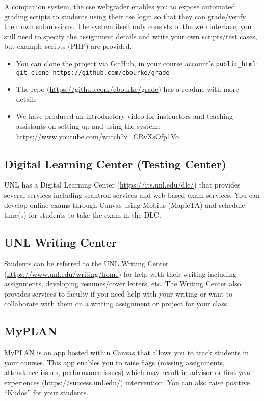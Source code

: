 \documentclass[12pt]{scrartcl}
\begin{document}
A companion system, the cse webgrader enables you to expose
automated grading scripts to students using their cse login so
that they can grade/verify their own submissions.  The system
itself only consists of the web interface, you still need to
specify the assignment details and write your own scripts/test
cases, but example scripts (PHP) are provided.

\begin{itemize}
  \item You can clone the project via GitHub, in your course
  account's \texttt{public_html}: 
   \texttt{git clone https://github.com/cbourke/grade}
  \item The repo (\url{https://github.com/cbourke/grade}) has a
  readme with more details
  \item We have produced an introductory video for instructors 
  and teaching assistants on setting up and using the system:
  \url{https://www.youtube.com/watch?v=CRvXsOfp1Vo}
\end{itemize}

\subsection{Digital Learning Center (Testing Center)}

UNL has a Digital Learning Center (\url{https://its.unl.edu/dlc/})
that provides several services including scantron services and 
web-based exam services.  You can develop online exams through
Canvas using Mobius (MapleTA) and schedule time(s) for students
to take the exam in the DLC.  

\subsection{UNL Writing Center}

Students can be referred to the UNL Writing Center (\url{https://www.unl.edu/writing/home}) for help with their writing including
assignments, developing resumes/cover letters, etc.  The Writing
Center also provides services to faculty if you need help with
your writing or want to collaborate with them on a writing assignment
or project for your class.

\subsection{MyPLAN}

MyPLAN is an app hosted within Canvas that allows you to
track students in your courses.  This app enables you to
raise flags (missing assignments, attendance issues, performance
issues) which may result in advisor or first year experiences
(\url{https://success.unl.edu/}) intervention.  You can also
raise positive ``Kudos'' for your students.
\end{document}
